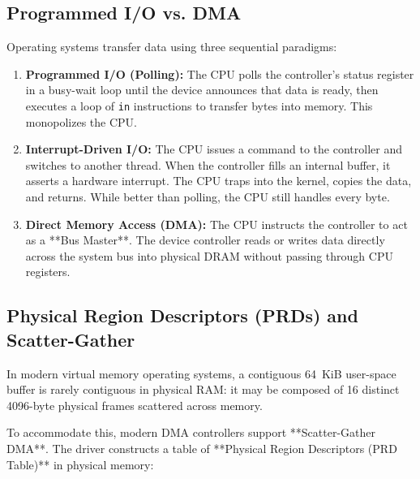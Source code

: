 \subsection{Programmed I/O vs. DMA}
Operating systems transfer data using three sequential paradigms:
\begin{enumerate}
    \item \textbf{Programmed I/O (Polling):} The CPU polls the controller's status register in a busy-wait loop until the device announces that data is ready, then executes a loop of \texttt{in} instructions to transfer bytes into memory. This monopolizes the CPU.
    \item \textbf{Interrupt-Driven I/O:} The CPU issues a command to the controller and switches to another thread. When the controller fills an internal buffer, it asserts a hardware interrupt. The CPU traps into the kernel, copies the data, and returns. While better than polling, the CPU still handles every byte.
    \item \textbf{Direct Memory Access (DMA):} The CPU instructs the controller to act as a **Bus Master**. The device controller reads or writes data directly across the system bus into physical DRAM without passing through CPU registers.
\end{enumerate}

\subsection{Physical Region Descriptors (PRDs) and Scatter-Gather}
In modern virtual memory operating systems, a contiguous 64~KiB user-space buffer is rarely contiguous in physical RAM: it may be composed of 16 distinct 4096-byte physical frames scattered across memory.

To accommodate this, modern DMA controllers support **Scatter-Gather DMA**. The driver constructs a table of **Physical Region Descriptors (PRD Table)** in physical memory:

